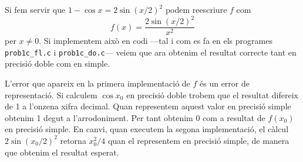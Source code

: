\documentclass[12pt]{article}
\begin{document}
Si fem servir que \( 1 - \cos{x} = 2 \sin{(x/2)}^2 \) podem reescriure \( f \) com
\begin{equation*}
	f(x) = \dfrac{2\sin{(x/2)^2}}{x^2}
\end{equation*}
per \( x \neq 0 \). Si implementem això en codi ---tal i com es fa en els programes \texttt{prob1c\_fl.c} i \texttt{prob1c\_do.c}--- veiem que ara obtenim el resultat correcte tant en precisió doble com en simple.

L'error que apareix en la primera implementació de \( f \) és un error de representació. Si calculem \( \cos{x_0} \) en precisió doble trobem que el resultat difereix de 1 a l'onzena xifra decimal. Quan representem aquest valor en precisió simple obtenim 1 degut a l'arrodoniment. Per tant obtenim 0 com a resultat de \( f(x_0) \) en precisió simple. En canvi, quan executem la segona implementació, el càlcul \( 2\sin{(x_{0}/2)}^2 \) retorna \( x_{0}^2/4 \) quan el representem en precisió simple, de manera que obtenim el resultat esperat. 
\end{document}
